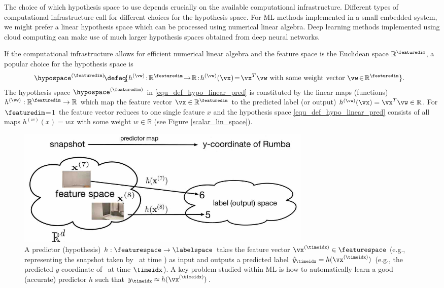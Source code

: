 \documentclass[12pt]{report}
\begin{document}
The choice of which hypothesis space to use depends crucially on the available 
computational infrastructure. Different types of computational infrastructure call 
for different choices for the hypothesis space. For ML methods implemented in 
a small embedded system, we might prefer a linear hypothesis space which can 
be processed using numerical linear algebra. Deep learning methods implemented 
using cloud computing can make use of much larger hypothesis spaces obtained 
from deep neural networks. 

If the computational infrastructure allows for efficient numerical linear algebra and the feature 
space is the Euclidean space $\mathbb{R}^{\featuredim}$, a popular choice for the hypothesis 
space is  
\begin{align}
\label{equ_def_hypo_linear_pred}
\hspace*{-3mm}\hypospace^{(\featuredim)} \!\defeq\!\{ h^{(\vw)}\!:\!\mathbb{R}^{\featuredim}\!\rightarrow\!\mathbb{R}\!:\!h^{(\vw)}(\vx)\!=\!\vx^{T} \vw \mbox{ with some weight vector } \vw\!\in\!\mathbb{R}^{\featuredim} \}.  
\end{align}
The hypothesis space $\hypospace^{(\featuredim)}$ in \eqref{equ_def_hypo_linear_pred} is constituted 
by the linear maps (functions) $h^{(\vw)}: \mathbb{R}^{\featuredim} \rightarrow \mathbb{R}$ which map 
the feature vector $\vx \in \mathbb{R}^{\featuredim}$ to the predicted label (or output) $h^{(\vw)}(\vx) = \vx^{T} \vw \in \mathbb{R}$. 
For $\featuredim\!=\!1$ the feature vector reduces to one single feature $x$ and the hypothesis space 
\eqref{equ_def_hypo_linear_pred} consists of all maps $h^{(w)}(x) = w x$ with some weight $w \in \mathbb{R}$ (see Figure \ref{scalar_lin_space}). 


\begin{figure}[htbp]
    \centering
    \includegraphics[width=0.7\textwidth]{HypothesisMapRumba.jpg}  
    \caption{A predictor (hypothesis) $h: \featurespace \rightarrow \labelspace$ takes the feature vector $\vx^{(\timeidx)} \in \featurespace$ 
    (e.g., representing the snapshot taken by \rumba\, at time \timeidx) as input and outputs a predicted label $\hat{y}_{\timeidx}=h(\vx^{(\timeidx)} )$ (e.g., 
    the predicted $y$-coordinate of \rumba\, at time $\timeidx$). 
    A key problem studied within ML is how to automatically learn a good (accurate) predictor $h$ such that $y_{\timeidx} \approx h(\vx^{(\timeidx)} )$. }
\label{fig:Hypothesis Map}
\end{figure}
\end{document}
